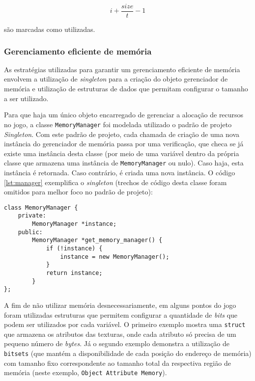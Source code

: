     \begin{equation} \label{Limite superior de alocação na memória de uma posição i}
    i + \frac{size}{t} - 1
    \end{equation}

    são marcadas como utilizadas.

    \subsubsection{Gerenciamento eficiente de memória}

    As estratégias utilizadas para garantir um gerenciamento eficiente de memória envolvem a utilização de \textit{singleton} para a criação do objeto gerenciador de memória e utilização de estruturas de dados que permitam configurar o tamanho a ser utilizado.

    Para que haja um único objeto encarregado de gerenciar a alocação de recursos no jogo, a classe \texttt{MemoryManager} foi modelada utilizado o padrão de projeto \textit{Singleton}. Com este padrão de projeto, cada chamada de criação de uma nova instância do gerenciador de memória passa por uma verificação, que checa se já existe uma instância desta classe (por meio de uma variável dentro da própria classe que armazena uma instância de \texttt{MemoryManager} ou nulo). Caso haja, esta instância é retornada. Caso contrário, é criada uma nova instância. O código \ref{lst:manager} exemplifica o \textit{singleton} (trechos de código desta classe foram omitidos para melhor foco no padrão de projeto):

\begin{lstlisting}[caption={\textit{Singleton} do gerenciador de memória.},label={lst:manager}]
class MemoryManager {
    private:
        MemoryManager *instance;
    public:
        MemoryManager *get_memory_manager() {
            if (!instance) {
                instance = new MemoryManager();
            }
            return instance;
        }
};
\end{lstlisting}

A fim de não utilizar memória desnecessariamente, em alguns pontos do jogo foram utilizadas estruturas que permitem configurar a quantidade de \textit{bits} que podem ser utilizados por cada variável. O primeiro exemplo mostra uma \texttt{struct} que armazena os atributos das texturas, onde cada atributo só precisa de um pequeno número de \textit{bytes}. Já o segundo exemplo demonstra a utilização de \texttt{bitsets} (que mantém a disponibilidade de cada posição do endereço de memória) com tamanho fixo correspondente ao tamanho total da respectiva região de memória (neste exemplo, \texttt{Object Attribute Memory}).


